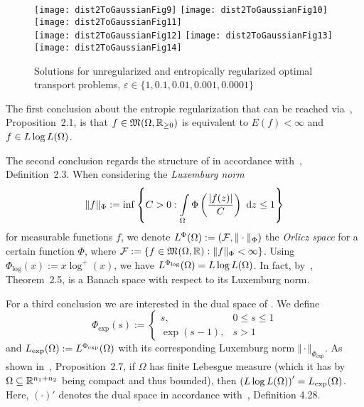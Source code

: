 \begin{figure}
	\texttt{[image: dist2ToGaussianFig9]}\hfill
	\texttt{[image: dist2ToGaussianFig10]}\hfill
	\texttt{[image: dist2ToGaussianFig11]} \\
	\texttt{[image: dist2ToGaussianFig12]}\hfill
	\texttt{[image: dist2ToGaussianFig13]}\hfill
	\texttt{[image: dist2ToGaussianFig14]}\hfill
	\caption{Solutions for unregularized and entropically regularized optimal transport problems, $\varepsilon \in \{ 1, 0.1, 0.01, 0.001, 0.0001 \}$}\label{RegImages}
\end{figure}

The first conclusion about the entropic regularization that can be reached via~\cite{Cla2021}, Proposition~2.1, is that $f \in \MF{\Omega}{\RZero}$ is equivalent to $E(f) < \infty$ and $f \in \LLL$.

The second conclusion regards the structure of \LLL{} in accordance with\ \cite{Cla2021}, Definition~2.3. When considering the \textit{Luxemburg norm}
\[ \Vert f \Vert_\Phi := \inf \left\{ C > 0 : \int\limits_\Omega \Phi\left( \frac{\vert f(z) \vert}{C} \right)~\D[z] \le 1 \right\} \]
for measurable functions $f$, we denote $\Orlicz{\Phi} := (\mathcal{F}, \Vert \cdot \Vert_\Phi)$ the \textit{Orlicz space} for a certain function $\Phi$, where $\mathcal{F} := \{ f \in \MF{\Omega}{\R} : \Vert f \Vert_\Phi < \infty \}$. Using $\Phi_{\log}(x) := x \log^+ (x)$, we have $\Orlicz{\Phi_{\log}} = \LLL$. In fact, by~\cite{Cla2021}, Theorem~2.5, \LLL{} is a Banach space with respect to its Luxemburg norm.

For a third conclusion we are interested in the dual space of \LLL{}. We define
\[ \Phi_{\exp}(s) := \begin{cases}
	s, & 0 \le s \le 1 \\
	\exp(s - 1), & s > 1
\end{cases} \]
and $\Lexp := \Orlicz{\Phi_{\exp}}$ with its corresponding Luxemburg norm $\Vert \cdot \Vert_{\Phi_{\exp}}$. As shown in~\cite{Cla2021}, Proposition~2.7, if $\Omega$ has finite Lebesgue measure (which it has by $\Omega \subseteq \R^{n_1 + n_2}$ being compact and thus bounded), then ${(\LLL)}' = \Lexp$. Here, ${(\cdot)}'$ denotes the dual space in accordance with\ \cite{Ryn2008}, Definition 4.28.

